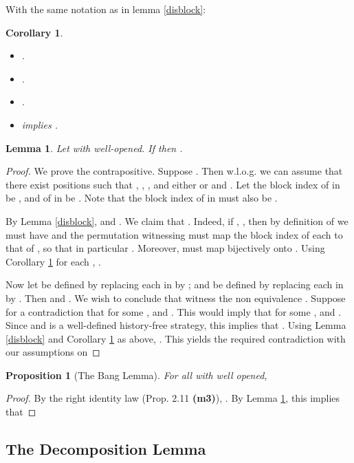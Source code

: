 \documentclass[11pt]{article}
\newtheorem{lemma}[theorem]{Lemma}
\newtheorem{proposition}[theorem]{Proposition}
\newtheorem{corollary}[theorem]{Corollary}
\begin{document}
With the same notation as in lemma \ref{disblock}:

\begin{corollary}\label{cordisblock}
\begin{itemize}
\item[(i)] .
\item[(ii)] .
\item[(iii)] .
\item[(iv)]  implies .
\end{itemize}
\end{corollary}

\begin{lemma}\label{lemma2}
Let  with  well-opened. If
 then .
\end{lemma}
\begin{proof} We prove the contrapositive. Suppose
. Then w.l.o.g. we can assume that there
exist positions  such that ,
, , and either
 or  and
. Let the block index of  in  be
, and of  in  be . Note that the block index of
 in  must also be .

By Lemma \ref{disblock},  and . We
claim that . Indeed, if , , then by definition of
 we must have  and the permutation
 witnessing  must map the block
index of each  to that of , so that in particular
. Moreover,  must map
 bijectively onto . Using
Corollary \ref{cordisblock} for each , .

Now let  be defined by replacing each  in  by ; and  be defined by replacing each 
in  by . Then  and . We wish to
conclude that  witness the non equivalence
. Suppose for a
contradiction that for some ,
 and . This
would imply that for some ,  and
. Since  and
 is a well-defined history-free strategy, this implies that
. Using Lemma \ref{disblock} and Corollary
\ref{cordisblock} as above, . This yields the
required contradiction with our assumptions on 
\end{proof}

\begin{proposition}
[The Bang Lemma]

For all  with  well opened,

\end{proposition}

\begin{proof} By the right identity law (Prop. 2.11 \textbf{(m3)}),
 .
By Lemma \ref{lemma2}, this implies that

\end{proof}


\subsection{The Decomposition Lemma}
\end{document}
